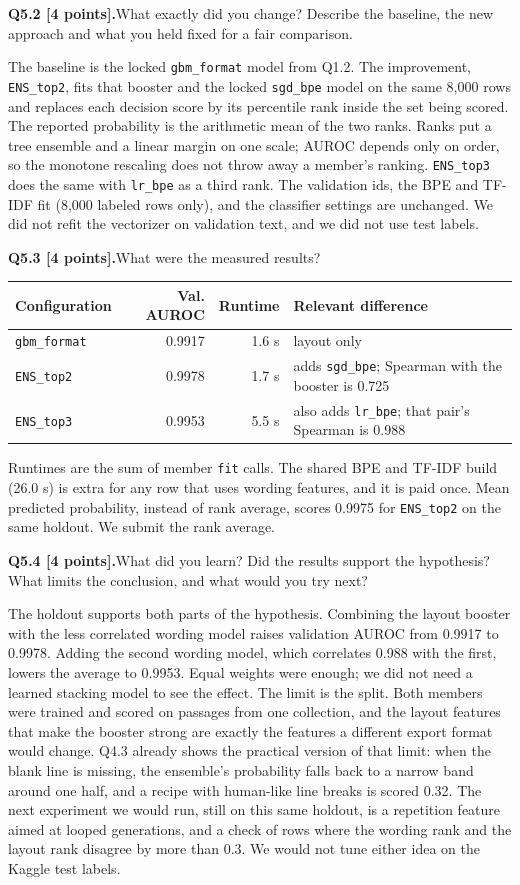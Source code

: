 \documentclass[11pt,letterpaper]{article}
\newcommand{\question}[2]{\needspace{4\baselineskip}\par\addvspace{0.45em}\noindent\textbf{#1}\quad #2\par\nobreak\vspace{0.1em}}
\newcommand{\smallnote}[1]{{\small\color{muted}#1}}
\begin{document}
\question{Q5.2 [4 points].}{What exactly did you change? Describe the baseline, the new approach and what you held fixed for a fair comparison.}

The baseline is the locked \texttt{gbm\_format} model from Q1.2. The improvement, \texttt{ENS\_top2}, fits that booster and the locked \texttt{sgd\_bpe} model on the same 8{,}000 rows and replaces each decision score by its percentile rank inside the set being scored. The reported probability is the arithmetic mean of the two ranks. Ranks put a tree ensemble and a linear margin on one scale; AUROC depends only on order, so the monotone rescaling does not throw away a member's ranking. \texttt{ENS\_top3} does the same with \texttt{lr\_bpe} as a third rank. The validation ids, the BPE and TF-IDF fit (8{,}000 labeled rows only), and the classifier settings are unchanged. We did not refit the vectorizer on validation text, and we did not use test labels.

\question{Q5.3 [4 points].}{What were the measured results?}
\begin{tabularx}{\linewidth}{@{}YrrY@{}}\toprule Configuration & Val. AUROC & Runtime & Relevant difference \\ \midrule
\texttt{gbm\_format} & 0.9917 & 1.6 s & layout only \\
\texttt{ENS\_top2} & 0.9978 & 1.7 s & adds \texttt{sgd\_bpe}; Spearman with the booster is 0.725 \\
\texttt{ENS\_top3} & 0.9953 & 5.5 s & also adds \texttt{lr\_bpe}; that pair's Spearman is 0.988 \\
\bottomrule\end{tabularx}

\smallnote{Runtimes are the sum of member \texttt{fit} calls. The shared BPE and TF-IDF build (26.0 s) is extra for any row that uses wording features, and it is paid once. Mean predicted probability, instead of rank average, scores 0.9975 for \texttt{ENS\_top2} on the same holdout. We submit the rank average.}

\question{Q5.4 [4 points].}{What did you learn? Did the results support the hypothesis? What limits the conclusion, and what would you try next?}

The holdout supports both parts of the hypothesis. Combining the layout booster with the less correlated wording model raises validation AUROC from 0.9917 to 0.9978. Adding the second wording model, which correlates 0.988 with the first, lowers the average to 0.9953. Equal weights were enough; we did not need a learned stacking model to see the effect. The limit is the split. Both members were trained and scored on passages from one collection, and the layout features that make the booster strong are exactly the features a different export format would change. Q4.3 already shows the practical version of that limit: when the blank line is missing, the ensemble's probability falls back to a narrow band around one half, and a recipe with human-like line breaks is scored 0.32. The next experiment we would run, still on this same holdout, is a repetition feature aimed at looped generations, and a check of rows where the wording rank and the layout rank disagree by more than 0.3. We would not tune either idea on the Kaggle test labels.
\end{document}
